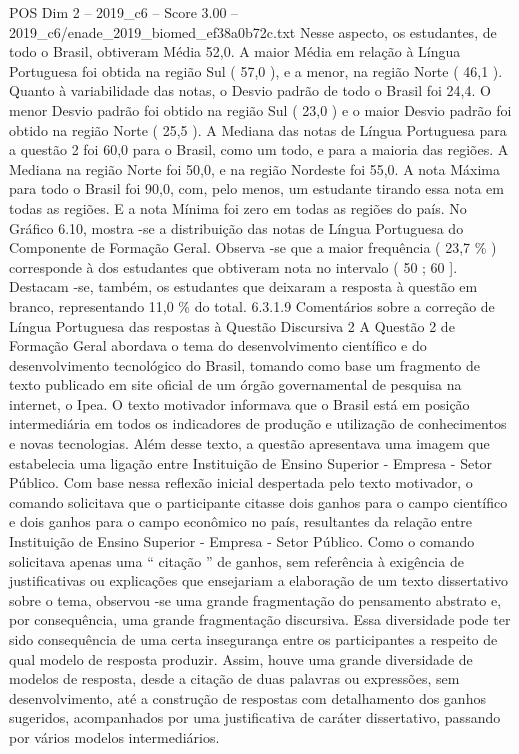 \begin{textsample}{POS Dim 2 – 2019\_c6 – Score 3.00 – 2019\_c6/enade\_2019\_biomed\_ef38a0b72c.txt}
Nesse aspecto, os estudantes, de todo o Brasil, obtiveram Média 52,0.
A maior Média em relação à Língua Portuguesa foi obtida na região Sul ( 57,0 ), e a menor, na região Norte ( 46,1 ).
Quanto à variabilidade das notas, o Desvio padrão de todo o Brasil foi 24,4.
O menor Desvio padrão foi obtido na região Sul ( 23,0 ) e o maior Desvio padrão foi obtido na região Norte ( 25,5 ).
A Mediana das notas de Língua Portuguesa para a questão 2 foi 60,0 para o Brasil, como um todo, e para a maioria das regiões.
A Mediana na região Norte foi 50,0, e na região Nordeste foi 55,0.
A nota Máxima para todo o Brasil foi 90,0, com, pelo menos, um estudante tirando essa nota em todas as regiões.
E a nota Mínima foi zero em todas as regiões do país.
No Gráfico 6.10, mostra -se a distribuição das notas de Língua Portuguesa do Componente de Formação Geral.
Observa -se que a maior frequência ( 23,7 \% ) corresponde à dos estudantes que obtiveram nota no intervalo ( 50 ; 60 ].
Destacam -se, também, os estudantes que deixaram a resposta à questão em branco, representando 11,0 \% do total. 6.3.1.9 Comentários sobre a correção de Língua Portuguesa das respostas à Questão Discursiva 2 A Questão 2 de Formação Geral abordava o tema do desenvolvimento científico e do desenvolvimento tecnológico do Brasil, tomando como base um fragmento de texto publicado em site oficial de um órgão governamental de pesquisa na internet, o Ipea.
O texto motivador informava que o Brasil está em posição intermediária em todos os indicadores de produção e utilização de conhecimentos e novas tecnologias.
Além desse texto, a questão apresentava uma imagem que estabelecia uma ligação entre Instituição de Ensino Superior - Empresa - Setor Público.
Com base nessa reflexão inicial despertada pelo texto motivador, o comando solicitava que o participante citasse dois ganhos para o campo científico e dois ganhos para o campo econômico no país, resultantes da relação entre Instituição de Ensino Superior - Empresa - Setor Público.
Como o comando solicitava apenas uma “ citação ” de ganhos, sem referência à exigência de justificativas ou explicações que ensejariam a elaboração de um texto dissertativo sobre o tema, observou -se uma grande fragmentação do pensamento abstrato e, por consequência, uma grande fragmentação discursiva.
Essa diversidade pode ter sido consequência de uma certa insegurança entre os participantes a respeito de qual modelo de resposta produzir.
Assim, houve uma grande diversidade de modelos de resposta, desde a citação de duas palavras ou expressões, sem desenvolvimento, até a construção de respostas com detalhamento dos ganhos sugeridos, acompanhados por uma justificativa de caráter dissertativo, passando por vários modelos intermediários.

\end{textsample}
